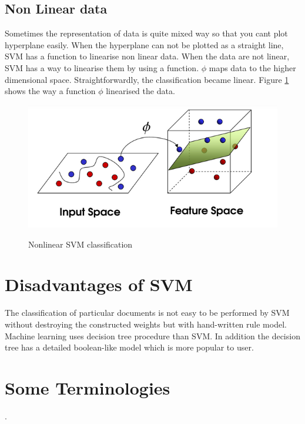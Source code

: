\subsection{Non Linear data} 
Sometimes the representation of data is quite mixed way so that you cant plot hyperplane easily. When the hyperplane can not be plotted as a straight line,  SVM has a function to linearise non linear data.  When the data are not linear, SVM has a way to linearise them by using a function. $ \phi$ maps data to the higher dimensional space. Straightforwardly, the classification became linear. Figure \ref{SVMNL} shows the way a function $ \phi$ linearised the data.

\begin{figure}[hbtp]
\caption{Nonlinear SVM classification}
\centering
\includegraphics[scale=.7]{images/SVMNL.png}\label{SVMNL}
\end{figure}
 
\section{Disadvantages of SVM}
The classification of particular documents is not easy to be performed by SVM without destroying the constructed weights  but with hand-written rule model. Machine learning uses decision tree procedure than SVM.
In addition the decision tree has a detailed boolean-like  model which is more popular to user.

\section{Some Terminologies}
.

